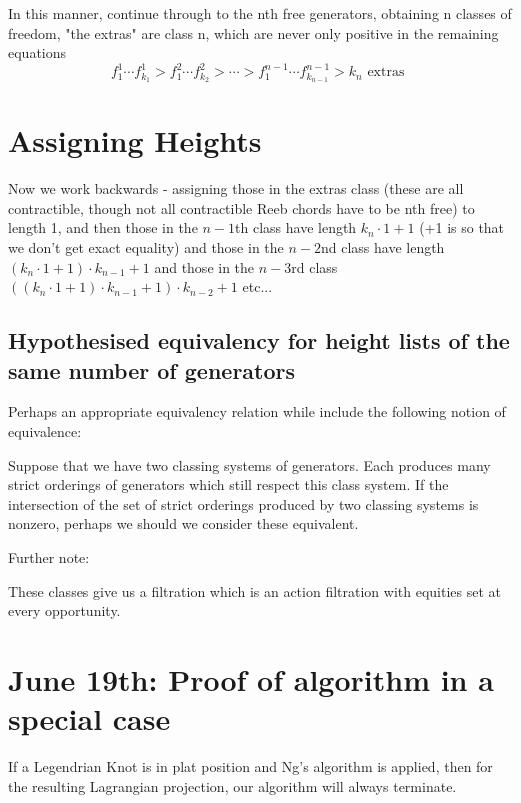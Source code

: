\documentclass[11pt,oneside]{amsart}
\begin{document}
In this manner, continue through to the nth free generators, obtaining n classes of freedom, "the extras" are class n, which are never only positive in the remaining equations
\[f^{1}_1 \cdots f^{1}_{k_1} > f^{2}_1 \cdots f^{2}_{k_2}> \cdots > f^{n-1}_1 \cdots f^{n-1}_{k_{n-1}} > k_n \text{ extras }\]


\section{Assigning Heights}

Now we work backwards - assigning those in the extras class (these are all contractible, though not all contractible Reeb chords have to be nth free) to length 1, and then those in the $n-1$th class have length $k_n \cdot 1 + 1$ (+1 is so that we don't get exact equality) and those in the $n-2$nd class have length $ (k_n \cdot 1 + 1)\cdot k_{n-1} + 1$ and those in the $n-3$rd class $ ((k_n \cdot 1 + 1)\cdot k_{n-1} + 1)\cdot k_{n-2} + 1$ etc...




\subsection{Hypothesised equivalency for height lists of the same number of generators}

Perhaps an appropriate equivalency relation while include the following notion of equivalence:

Suppose that we have two classing systems of generators. Each produces many strict orderings of generators which still respect this class system. If the intersection of the set of strict orderings produced by two classing systems is nonzero, perhaps we should we consider these equivalent.




Further note:

These classes give us a filtration which is an action filtration with equities set at every opportunity. 







\section{June 19th: Proof of algorithm in a special case}


\begin{theorem}
    If a Legendrian Knot is in plat position and Ng's algorithm is applied, then for the resulting Lagrangian projection, our algorithm will always terminate.
\end{theorem}
\end{document}
